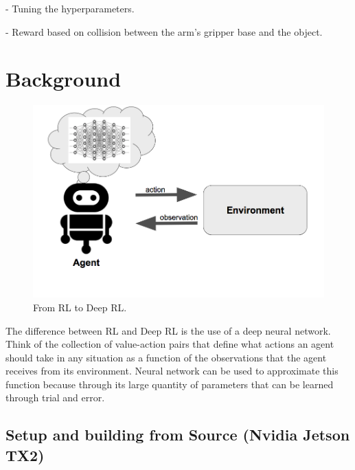 \documentclass[10pt,journal,compsoc]{IEEEtran}
\begin{document}
- Tuning the hyperparameters.

- Reward based on collision between the arm’s gripper base and the object.
\section{Background}
\begin{figure}[thpb]
      \centering
      \includegraphics[width=\linewidth]{FromRLToDeepRL.png}
      \caption{From RL to Deep RL.}
      \label{fig:robot1}
\end{figure}
The difference between RL and Deep RL is the use of a deep neural network. Think of the collection of value-action pairs that define what actions an agent should take in any situation as a function of the observations that the agent receives from its environment. Neural network can be used to approximate this function because through its large quantity of parameters that can be learned through trial and error.
\subsection{Setup and building from Source (Nvidia Jetson TX2)}
\end{document}
